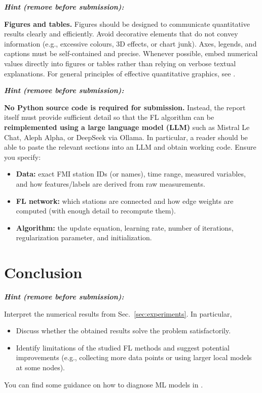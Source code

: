 \documentclass{article}
\newenvironment{hint}{%
	\par\medskip\noindent
	\begin{minipage}[t]{\dimexpr\columnwidth-8mm}%
	\raggedright\itshape
	\textbf{Hint (remove before submission):}\space
}{%
	\end{minipage}\par\medskip
}
\begin{document}
\begin{hint}
	\textbf{Figures and tables.}
	Figures should be designed to communicate quantitative results clearly and efficiently.
	Avoid decorative elements that do not convey information (e.g., excessive colours, 3D effects,
	or chart junk). Axes, legends, and captions must be self-contained and precise.
	Whenever possible, embed numerical values directly into figures or tables rather
	than relying on verbose textual explanations. For general principles of effective
	quantitative graphics, see \cite{TufteVDQI}.
\end{hint}

\begin{hint}
\textbf{No Python source code is required for submission.}
Instead, the report itself must provide sufficient detail so that the
FL algorithm can be \textbf{reimplemented using a large language model (LLM)}
such as Mistral Le Chat, Aleph Alpha, or DeepSeek via Ollama.
In particular, a reader should be able to paste the relevant sections
into an LLM and obtain working code. Ensure you specify:
\begin{itemize}
	\item \textbf{Data:} exact FMI station IDs (or names), time range, measured
	variables, and how features/labels are derived from raw measurements.
	\item \textbf{FL network:} which stations are connected and how edge weights
	are computed (with enough detail to recompute them).
	\item \textbf{Algorithm:} the update equation, learning rate, number of
	iterations, regularization parameter, and initialization.
\end{itemize}
\end{hint}



\section{Conclusion}
\label{sec:conclusion}
\begin{hint}
Interpret the numerical results from Sec.~\ref{sec:experiments}.
In particular,
\begin{itemize}
	\item Discuss whether the obtained results solve the problem satisfactorily.
	\item Identify limitations of the studied FL methods and suggest potential improvements (e.g.,
	collecting more data points or using larger local models at some nodes).
\end{itemize}
You can find some guidance on how to diagnose ML models in \cite[Sec.~6.6]{Jung2022}.
\end{hint}
\end{document}
